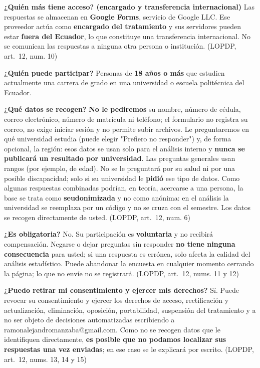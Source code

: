 \documentclass[11pt,a4paper]{article}
\begin{document}
\textbf{¿Quién más tiene acceso? (encargado y transferencia internacional)} Las respuestas se almacenan en \textbf{Google Forms}, servicio de Google LLC. Ese proveedor actúa como \textbf{encargado del tratamiento} y sus servidores pueden estar \textbf{fuera del Ecuador}, lo que constituye una transferencia internacional. No se comunican las respuestas a ninguna otra persona o institución. {\footnotesize\color{gray}(LOPDP, art.~12, num. 10)}

\textbf{¿Quién puede participar?} Personas de \textbf{18 años o más} que estudien actualmente una carrera de grado en una universidad o escuela politécnica del Ecuador.

\textbf{¿Qué datos se recogen?} \textbf{No le pediremos} su nombre, número de cédula, correo electrónico, número de matrícula ni teléfono; el formulario no registra su correo, no exige iniciar sesión y no permite subir archivos. Le preguntaremos en qué universidad estudia (puede elegir "Prefiero no responder") y, de forma opcional, la región: esos datos se usan solo para el análisis interno y \textbf{nunca se publicará un resultado por universidad}. Las preguntas generales usan rangos (por ejemplo, de edad). No se le preguntará por su salud ni por una posible discapacidad; solo si su universidad le \textbf{pidió} ese tipo de datos. Como algunas respuestas combinadas podrían, en teoría, acercarse a una persona, la base se trata como \textbf{seudonimizada} y no como anónima: en el análisis la universidad se reemplaza por un código y no se cruza con el semestre. Los datos se recogen directamente de usted. {\footnotesize\color{gray}(LOPDP, art.~12, num. 6)}

\textbf{¿Es obligatoria?} No. Su participación es \textbf{voluntaria} y no recibirá compensación. Negarse o dejar preguntas sin responder \textbf{no tiene ninguna consecuencia} para usted; si una respuesta es errónea, solo afecta la calidad del análisis estadístico. Puede abandonar la encuesta en cualquier momento cerrando la página; lo que no envíe no se registrará. {\footnotesize\color{gray}(LOPDP, art.~12, nums. 11 y 12)}

\textbf{¿Puedo retirar mi consentimiento y ejercer mis derechos?} Sí. Puede revocar su consentimiento y ejercer los derechos de acceso, rectificación y actualización, eliminación, oposición, portabilidad, suspensión del tratamiento y a no ser objeto de decisiones automatizadas escribiendo a ramonalejandromanzaba@gmail.com. Como no se recogen datos que le identifiquen directamente, \textbf{es posible que no podamos localizar sus respuestas una vez enviadas}; en ese caso se le explicará por escrito. {\footnotesize\color{gray}(LOPDP, art.~12, nums. 13, 14 y 15)}
\end{document}
